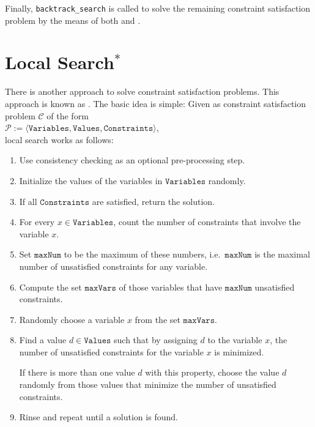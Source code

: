 Finally, \texttt{backtrack\_search} is called to solve the remaining constraint satisfaction problem by the
means of both  and . 


\section{Local Search$^*$}
There is another approach to solve constraint satisfaction problems.  This approach is known as
.  The basic idea is simple: Given as constraint satisfaction problem 
$\mathcal{C}$ of the form 
\\[0.2cm]
\hspace*{1.3cm}
$\mathcal{P} := \langle \texttt{Variables}, \texttt{Values}, \texttt{Constraints} \rangle$,
\\[0.2cm] 
local search works as follows: 
\begin{enumerate}
\item Use consistency checking as an optional pre-processing step.
\item Initialize the values of the variables in $\texttt{Variables}$ randomly.  
\item If all $\texttt{Constraints}$ are satisfied, return the solution.
\item For every  $x \in \texttt{Variables}$, count the number of  constraints that involve the
      variable $x$. 
\item Set $\texttt{maxNum}$ to be the maximum of these numbers, i.e.~$\texttt{maxNum}$ is the maximal number of
      unsatisfied constraints for any variable.
\item Compute the set $\texttt{maxVars}$ of those variables that have $\texttt{maxNum}$ unsatisfied constraints.
\item Randomly choose a variable $x$ from the set $\texttt{maxVars}$.
\item Find a value $d \in \texttt{Values}$ such that by assigning $d$ to the variable $x$, the number of
      unsatisfied constraints for the variable $x$ is minimized.  

      If there is more than one value $d$ with this property, choose the value $d$ randomly from those values
      that minimize the number of unsatisfied constraints.
\item Rinse and repeat until a solution is found.
\end{enumerate}


